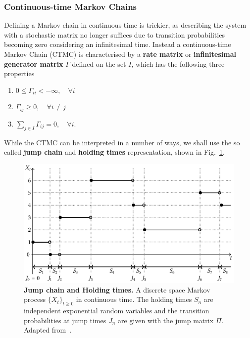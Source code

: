 \subsubsection{Continuous-time Markov Chains}
\label{subsubsect:CTMC}
Defining a Markov chain in continuous time is trickier, as describing the system with a stochastic matrix no longer suffices due to transition probabilities becoming zero considering an infinitesimal time. Instead a continuous-time Markov Chain (CTMC) is characterised by a \textbf{rate matrix} or \textbf{infinitesimal generator matrix} $\Gamma$ defined on the set $I$, which has the following three properties
\begin{enumerate}[label=\roman*)]
	\item $0 \leq \Gamma_{ii} <-\infty, \quad \forall i$
	\item $\Gamma_{ij} \geq 0, \quad \forall i \neq j$
	\item $\sum_{j \in I} \Gamma_{i j}=0, \quad \forall i$.
\end{enumerate}
While the CTMC can be interpreted in a number of ways, we shall use the so called \textbf{jump chain} and \textbf{holding times} representation, shown in Fig.~\ref{fig:holdingJumping}. 
\begin{figure}[h]
	\centering
	\includegraphics[width=0.9\linewidth]{Chapter3/Figs/Vector/ctmc.pdf}
	\caption[Jump chain and Holding times]{\textbf{Jump chain and Holding times.} A discrete space Markov process $\{X_t\}_{t\geq 0}$ in continuous time. The holding times $S_n$ are independent exponential random variables and the transition probabilities at jump times $J_n$ are given with the jump matrix $\Pi$. Adapted from~\cite{norris1998markov}.}
	\label{fig:holdingJumping}
\end{figure}

